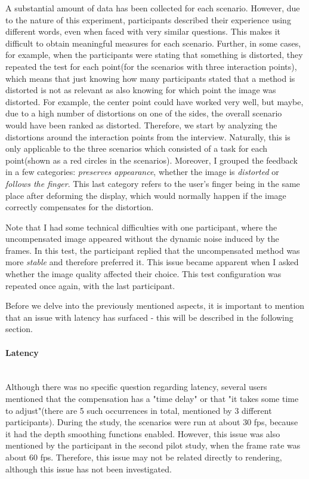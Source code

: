 \documentclass[]{article}
\begin{document}
A substantial amount of data has been collected for each scenario. However, due to the nature of this experiment, participants described their experience using different words, even when faced with very similar questions. This makes it difficult to obtain meaningful measures for each scenario. Further, in some cases, for example, when the participants were stating that something is distorted, they repeated the test for each point(for the scenarios with three interaction points), which means that just knowing how many participants stated that a method is distorted is not as relevant as also knowing for which point the image was distorted. For example, the center point could have worked very well, but maybe, due to a high number of distortions on one of the sides, the overall scenario would have been ranked as distorted. Therefore, we start by analyzing the distortions around the interaction points from the interview. Naturally, this is only applicable to the three scenarios which consisted of a task for each point(shown as a red circles in the scenarios). Moreover, I grouped the feedback in a few categories: \textit{preserves appearance}, whether the image is \textit{distorted} or \textit{follows the finger}. This last category refers to the user's finger being in the same place after deforming the display, which would normally happen if the image correctly compensates for the distortion.

Note that I had some technical difficulties with one participant, where the uncompensated image appeared without the dynamic noise induced by the frames. In this test, the participant replied that the uncompensated method was more \textit{stable} and therefore preferred it. This issue became apparent when I asked whether the image quality affected their choice. This test configuration was repeated once again, with the last participant.

Before we delve into the previously mentioned aspects, it is important to mention that an issue with latency has surfaced - this will be described in the following section. 

\paragraph{Latency}\mbox{}\\

Although there was no specific question regarding latency, several users mentioned that the compensation has a "time delay" or that "it takes some time to adjust"(there are 5 such occurrences in total, mentioned by 3 different participants). During the study, the scenarios were run at about 30 fps, because it had the depth smoothing functions enabled. However, this issue was also mentioned by the participant in the second pilot study, when the frame rate was about 60 fps. Therefore, this issue may not be related directly to rendering, although this issue has not been investigated.
 
\end{document}
